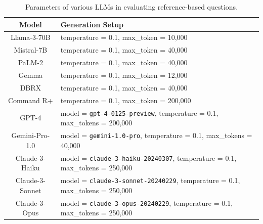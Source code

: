 \begin{table}[!t]
\centering
\small
\begin{tabular}{cl}
    \toprule
    \textbf{Model} & \textbf{Generation Setup} \\
    \midrule
    Llama-3-70B & temperature = 0.1, max\_token = 10,000  \\
    \midrule
    Mistral-7B & temperature = 0.1, max\_token = 40,000\\
    \midrule
    PaLM-2 & temperature = 0.1, max\_token = 40,000 \\
    \midrule
    Gemma & temperature = 0.1, max\_token = 12,000\\
    \midrule
    DBRX & temperature = 0.1, max\_token = 40,000 \\
    \midrule
    Command R+ & temperature = 0.1, max\_token = 200,000 \\
    \midrule
    GPT-4 
    & model = \texttt{gpt-4-0125-preview}, temperature = 0.1, max\_tokens = 200,000\\
    \midrule
    Gemini-Pro-1.0 
    & model = \texttt{gemini-1.0-pro}, temperature = 0.1, max\_tokens = 40,000\\
    \midrule
    Claude-3-Haiku 
    & model = \texttt{claude-3-haiku-20240307}, temperature = 0.1, max\_tokens = 250,000\\
    \midrule
    Claude-3-Sonnet 
    & model = \texttt{claude-3-sonnet-20240229}, temperature = 0.1, max\_tokens = 250,000\\
    \midrule
    Claude-3-Opus 
    & model = \texttt{claude-3-opus-20240229}, temperature = 0.1, max\_tokens = 250,000\\
    \bottomrule
\end{tabular}
\caption{Parameters of various LLMs in evaluating reference-based questions.}\label{tab:model_param_detail}
\end{table}




